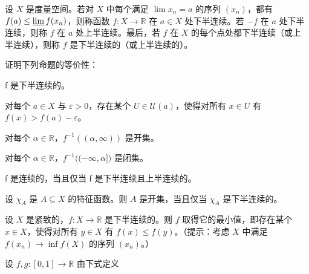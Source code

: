 \begin{exercises}
\item

设 $X$ 是度量空间。若对 $X$ 中每个满足 $\lim x_n = a$ 的序列 $(x_n)$，都有 $f(a) \leq \varliminf f(x_n)$，则称函数 $f: X \to \mathbb{R}$ 在 $a \in X$ 处下半连续。若 $-f$ 在 $a$ 处下半连续，则称 $f$ 在 $a$ 处上半连续。最后，若 $f$ 在 $X$ 的每个点处都下半连续（或上半连续），则称 $f$ 是下半连续的（或上半连续的）。

\begin{items}
\item

证明下列命题的等价性：

\begin{subitems}
\item

f 是下半连续的。

\item

对每个 $ a \in X $ 与 $ \varepsilon > 0 $，存在某个 $ U \in \mathcal{U}(a) $，使得对所有 $ x \in U $ 有 $ f(x) > f(a) - \varepsilon $。

\item

对每个 $ \alpha \in \mathbb{R} $，$ f^{-1}\left((\alpha, \infty)\right) $ 是开集。

\item

对每个 $ \alpha \in \mathbb{R} $，$ f^{-1}\big((-\infty, \alpha]\big) $ 是闭集。

\end{subitems}

\item

f 是连续的，当且仅当 f 是下半连续且上半连续的。

\item

设 $ \chi_A $ 是 $ A \subseteq X $ 的特征函数。则 $ A $ 是开集，当且仅当 $ \chi_A $ 是下半连续的。

\item

设 $X$ 是紧致的，$f: X \to \mathbb{R}$ 是下半连续的。则 $f$ 取得它的最小值，即存在某个 $x \in X$，使得对所有 $y \in X$ 有 $f(x) \leq f(y)$。（提示：考虑 $X$ 中满足 $f(x_n) \to \inf f(X)$ 的序列 $(x_n)$。）

\end{items}

\item

设 $ f, g\colon [0,1] \to \mathbb{R} $ 由下式定义


\end{exercises}

